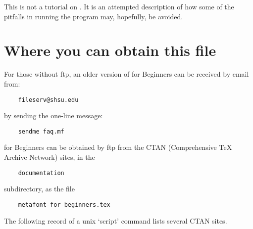 This is not a tutorial on \MF{}.  It is an attempted description of
how some of the pitfalls in running the program may, hopefully, be
avoided.


\section*{Where you can obtain this file}\label{sec:CTAN}%

For those without ftp, an older version of \MF{} for Beginners can be
received by email from:
\begin{verbatim}
    fileserv@shsu.edu
\end{verbatim}
by sending the one-line message:
\begin{verbatim}
    sendme faq.mf
\end{verbatim}

\MF{} for Beginners can be obtained by ftp from the CTAN
(Comprehensive \TeX{} Archive Network) sites, in the
\begin{verbatim}
    documentation
\end{verbatim}
subdirectory, as the file
\begin{verbatim}
    metafont-for-beginners.tex
\end{verbatim}

The following record of a unix `script' command lists several
CTAN sites.

